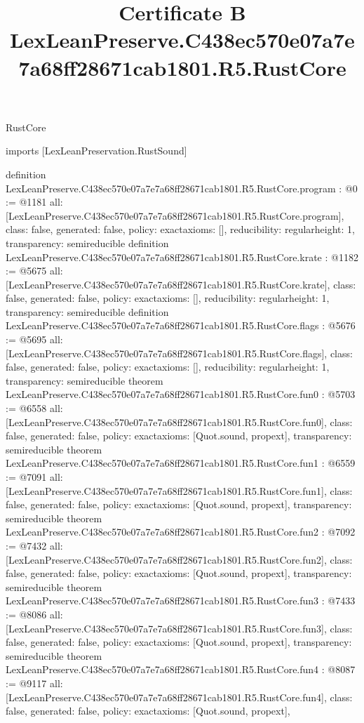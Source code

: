 \begin{lexlean}{RustCore}
\title{Certificate B LexLeanPreserve.C438ec570e07a7e7a68ff28671cab1801.R5.RustCore}
\begin{coremodule}
imports [LexLeanPreservation.RustSound]

definition LexLeanPreserve.C438ec570e07a7e7a68ff28671cab1801.R5.RustCore.program : @0 := @1181 {
  all: [LexLeanPreserve.C438ec570e07a7e7a68ff28671cab1801.R5.RustCore.program],
  class: false,
  generated: false,
  policy: exact{axioms: []},
  reducibility: regular{height: 1},
  transparency: semireducible
}
definition LexLeanPreserve.C438ec570e07a7e7a68ff28671cab1801.R5.RustCore.krate : @1182 := @5675 {
  all: [LexLeanPreserve.C438ec570e07a7e7a68ff28671cab1801.R5.RustCore.krate],
  class: false,
  generated: false,
  policy: exact{axioms: []},
  reducibility: regular{height: 1},
  transparency: semireducible
}
definition LexLeanPreserve.C438ec570e07a7e7a68ff28671cab1801.R5.RustCore.flags : @5676 := @5695 {
  all: [LexLeanPreserve.C438ec570e07a7e7a68ff28671cab1801.R5.RustCore.flags],
  class: false,
  generated: false,
  policy: exact{axioms: []},
  reducibility: regular{height: 1},
  transparency: semireducible
}
theorem LexLeanPreserve.C438ec570e07a7e7a68ff28671cab1801.R5.RustCore.fun0 : @5703 := @6558 {
  all: [LexLeanPreserve.C438ec570e07a7e7a68ff28671cab1801.R5.RustCore.fun0],
  class: false,
  generated: false,
  policy: exact{axioms: [Quot.sound, propext]},
  transparency: semireducible
}
theorem LexLeanPreserve.C438ec570e07a7e7a68ff28671cab1801.R5.RustCore.fun1 : @6559 := @7091 {
  all: [LexLeanPreserve.C438ec570e07a7e7a68ff28671cab1801.R5.RustCore.fun1],
  class: false,
  generated: false,
  policy: exact{axioms: [Quot.sound, propext]},
  transparency: semireducible
}
theorem LexLeanPreserve.C438ec570e07a7e7a68ff28671cab1801.R5.RustCore.fun2 : @7092 := @7432 {
  all: [LexLeanPreserve.C438ec570e07a7e7a68ff28671cab1801.R5.RustCore.fun2],
  class: false,
  generated: false,
  policy: exact{axioms: [Quot.sound, propext]},
  transparency: semireducible
}
theorem LexLeanPreserve.C438ec570e07a7e7a68ff28671cab1801.R5.RustCore.fun3 : @7433 := @8086 {
  all: [LexLeanPreserve.C438ec570e07a7e7a68ff28671cab1801.R5.RustCore.fun3],
  class: false,
  generated: false,
  policy: exact{axioms: [Quot.sound, propext]},
  transparency: semireducible
}
theorem LexLeanPreserve.C438ec570e07a7e7a68ff28671cab1801.R5.RustCore.fun4 : @8087 := @9117 {
  all: [LexLeanPreserve.C438ec570e07a7e7a68ff28671cab1801.R5.RustCore.fun4],
  class: false,
  generated: false,
  policy: exact{axioms: [Quot.sound, propext]},
}
\end{coremodule}
\end{lexlean}
